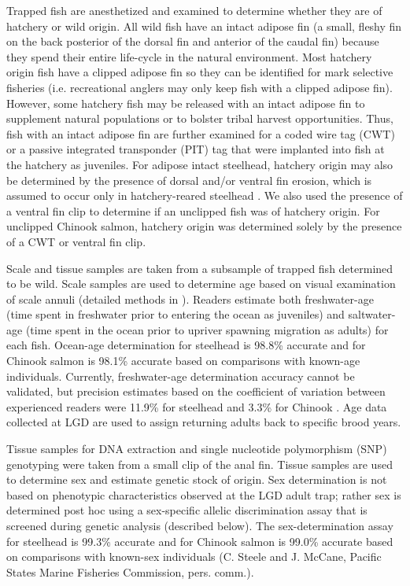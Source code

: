 \documentclass[11pt]{article}
\begin{document}
Trapped fish are anesthetized and examined to determine whether they are of hatchery or wild origin. All wild fish have an intact adipose fin (a small, fleshy fin on the back posterior of the dorsal fin and anterior of the caudal fin) because they spend their entire life-cycle in the natural environment. Most hatchery origin fish have a clipped adipose fin so they can be identified for mark selective fisheries (i.e. recreational anglers may only keep fish with a clipped adipose fin). However, some hatchery fish may be released with an intact adipose fin to supplement natural populations or to bolster tribal harvest opportunities. Thus, fish with an intact adipose fin are further examined for a coded wire tag (CWT) or a passive integrated transponder (PIT) tag that were implanted into fish at the hatchery as juveniles. For adipose intact steelhead, hatchery origin may also be determined by the presence of dorsal and/or ventral fin erosion, which is assumed to occur only in hatchery-reared steelhead \cite{Latremouille2003}. We also used the presence of a ventral fin clip to determine if an unclipped fish was of hatchery origin. For unclipped Chinook salmon, hatchery origin was determined solely by the presence of a CWT or ventral fin clip.
 
Scale and tissue samples are taken from a subsample of trapped fish determined to be wild. Scale samples are used to determine age based on visual examination of scale annuli (detailed methods in ). Readers estimate both freshwater-age (time spent in freshwater prior to entering the ocean as juveniles) and saltwater-age (time spent in the ocean prior to upriver spawning migration as adults) for each fish. Ocean-age determination for steelhead is 98.8\% accurate and for Chinook salmon is 98.1\% accurate based on comparisons with known-age individuals. Currently, freshwater-age determination accuracy cannot be validated, but precision estimates based on the coefficient of variation between experienced readers were 11.9\% for steelhead and 3.3\% for Chinook \cite{Schrader2013}. Age data collected at LGD are used to assign returning adults back to specific brood years.

Tissue samples for DNA extraction and single nucleotide polymorphism (SNP) genotyping were taken from a small clip of the anal fin.  Tissue samples are used to determine sex and estimate genetic stock of origin. Sex determination is not based on phenotypic characteristics observed at the LGD adult trap; rather sex is determined post hoc using a sex-specific allelic discrimination assay \cite{Campbell2012} that is screened during genetic analysis (described below). The sex-determination assay for steelhead is 99.3\% accurate and for Chinook salmon is 99.0\% accurate based on comparisons with known-sex individuals (C. Steele and J. McCane, Pacific States Marine Fisheries Commission, pers. comm.).
\end{document}
